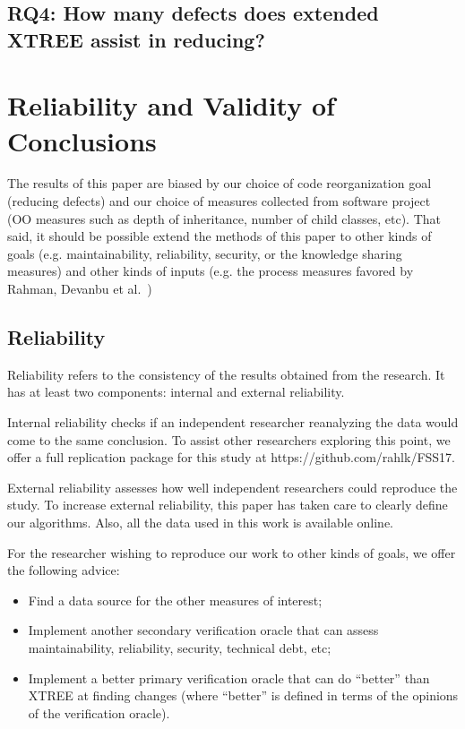 \documentclass[sigconf, proceedings, 9pt]{acmart}
\begin{document}
\subsection*{\textbf{RQ4: How many defects does extended XTREE assist 
in reducing?}} 

\section{Reliability and Validity of Conclusions}
\label{sect:valid}



The results of this paper are biased by our choice of code reorganization
goal (reducing defects) and our choice of measures collected from software
project (OO measures such as depth of inheritance, number of child classes,
etc). That said, it should be possible extend the methods of this paper to 
other
kinds of goals (e.g. maintainability, reliability, security, or the 
knowledge sharing
measures) and other kinds of
inputs (e.g. the process measures favored by Rahman,
Devanbu et al.~\cite{Rahman2013})

\subsection{Reliability}
Reliability refers to the consistency of the results obtained
from the research. It has at least two components: internal
and external reliability.

Internal reliability checks if an independent researcher
reanalyzing the data would come to the same conclusion.
To assist other researchers exploring this point, we offer a full 
replication package for this study at
https://github.com/rahlk/FSS17.

External reliability assesses how well independent researchers
could reproduce the study. To increase external
reliability, this paper has taken care to clearly define our
algorithms. Also, all the data used in this work is available
online.

For the researcher wishing to reproduce our work to other kinds of goals, 
we offer the following advice:

\begin{itemize}
\item Find a data source for the other measures of interest;
\item Implement another secondary verification oracle that can assess 
maintainability, reliability, security, technical debt, etc;
\item Implement a better primary verification oracle that can do ``better'' 
than XTREE at finding changes (where ``better'' is defined in terms
of the opinions of the verification oracle). 
\end{itemize}
\end{document}
